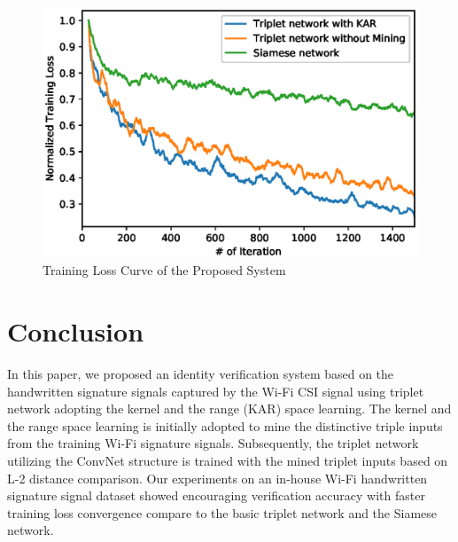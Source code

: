 \documentclass[runningheads]{llncs}
\begin{document}
    \begin{figure}[!h]
    \includegraphics[width=\textwidth]{normalized_loss_curve_ma30_v1.eps}
    \caption{Training Loss Curve of the Proposed System} \label{fig2}
\end{figure}
\fi

\section{Conclusion}
In this paper, we proposed an identity verification system based on the handwritten signature signals captured by the Wi-Fi CSI signal using triplet network adopting the kernel and the range (KAR) space learning. 
The kernel and the range space learning is initially adopted to mine the distinctive triple inputs from the training Wi-Fi signature signals. 
Subsequently, the triplet network utilizing the ConvNet structure is trained with the mined triplet inputs based on L-2 distance comparison. 
Our experiments on an in-house Wi-Fi handwritten signature signal dataset showed encouraging verification accuracy with faster training loss convergence compare to the basic triplet network and the Siamese network.
%
%
%
%
%
%






\end{document}
